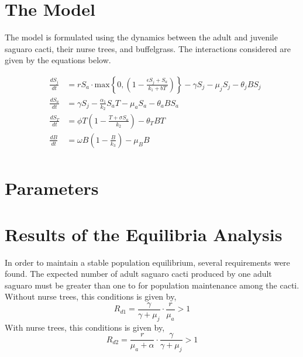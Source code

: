 \documentclass[size=custom,width=48 in,height=42 in, landscape]{sciposter}
\begin{document}
\begin{multicols}{3}
\section{The Model}
The model is formulated using the dynamics between the adult and juvenile saguaro cacti, their nurse trees, and buffelgrass. The interactions considered are given by the equations below.

\boldmath
\begin{eqnarray*}
&\displaystyle\frac{dS_j}{dt}&= rS_a\cdot \text{max}\left\lbrace0,\left(1-\displaystyle\frac{\epsilon S_j + S_a}{k_1+b T}\right) \right\rbrace - \gamma S_j - \mu_j S_j - \theta_j B S_j\\
&\displaystyle\frac{dS_a}{dt}& = \gamma S_j -\displaystyle\frac{\alpha_1}{k_2}S_a T - \mu_a S_a - \theta_a B S_a\\
&\displaystyle\frac{dS_T}{dt}& = \phi T\left(1 - \displaystyle\frac{T + \sigma S_a}{k_2}\right) - \theta_T B T\\
&\displaystyle\frac{dB}{dt}& = \omega B \left(1-\displaystyle\frac{B}{k_3}\right) - \mu_B B\\
\end{eqnarray*}

\vspace{-1cm}
\section{Parameters}
\begin{figure}
\centering

\end{figure}
\columnbreak

\vspace{-1.5cm}
\section{Results of the Equilibria Analysis}
In order to maintain a stable population equilibrium, several requirements were found. The expected number of adult saguaro cacti produced by one adult saguaro must be greater than one to for population maintenance among the cacti. Without nurse trees, this conditions is given by,
$$R_{d1} = \displaystyle\frac{\gamma}{\gamma+\mu_j} \cdot\displaystyle\frac{r}{\mu_a} > 1$$
With nurse trees, this conditions is given by,
$$R_{d2} = \displaystyle\frac{r}{\mu_a+\alpha}\cdot\frac{\gamma}{\gamma + \mu_j} > 1$$
\begin{center}

\end{center}

\end{multicols}
\end{document}
